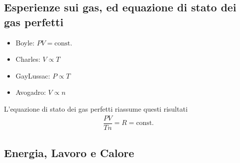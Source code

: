 \documentclass[letterpaper,10pt,italian]{jupyterBook}
\begin{document}
\subsection{Esperienze sui gas, ed equazione di stato dei gas perfetti}
\label{\detokenize{ch/thermodynamics/foundation-experiments:esperienze-sui-gas-ed-equazione-di-stato-dei-gas-perfetti}}\begin{itemize}
\item {} 
\sphinxAtStartPar
Boyle: \(PV = \text{const.}\)

\item {} 
\sphinxAtStartPar
Charles: \(V \propto T\)

\item {} 
\sphinxAtStartPar
Gay\sphinxhyphen{}Lussac: \(P \propto T\)

\item {} 
\sphinxAtStartPar
Avogadro: \(V \propto n\)

\end{itemize}

\sphinxAtStartPar
L’equazione di stato dei gas perfetti riassume questi risultati
\begin{equation*}
\begin{split}\dfrac{P V}{T n} = R = \text{const.}\end{split}
\end{equation*}

\subsection{Energia, Lavoro e Calore}
\label{\detokenize{ch/thermodynamics/foundation-experiments:energia-lavoro-e-calore}}
\end{document}
